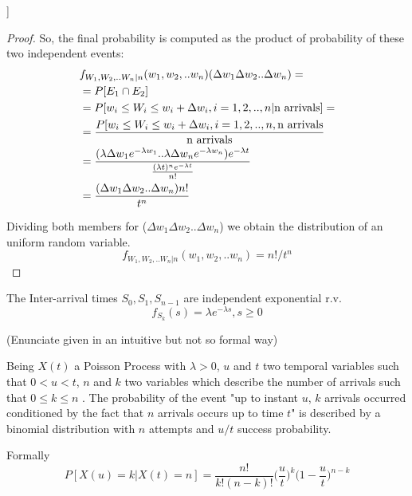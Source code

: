 \begin{theorem}[5.7, Joint probability of [$W_{1}$,..$W_{n}$]]
\begin{proof}
		So, the final probability is computed as the product of probability of these two independent events:
		\begin{equation}
			\begin{split}
				& f_{W_1,W_2,..W_n|n} (w_1,w_2,..w_n)( \Delta w_1\Delta w_2..\Delta w_n) = \\
				& =P[E_1 \cap E_2 ]\\
				& =P[w_i\leq W_i \leq w_i+\Delta w_i, i=1,2,..,n| \textnormal{n arrivals}]=\\
				& =\frac{P[w_i\leq W_i \leq w_i+\Delta w_i, i=1,2,..,n,\textnormal{n arrivals}}{\textnormal{n arrivals}}\\
				& =\frac{(\lambda \Delta w_1 e^{-\lambda w_1}..\lambda \Delta w_n e^{-\lambda w_n})e^{-\lambda t}}{\frac{(\lambda t)^{n}e^{-\lambda t}} {n!}}\\
				& =\frac{ (\Delta w_1 \Delta w_2.. \Delta w_n) n!}{t^n}
			\end{split}
		\end{equation}

		Dividing both members for ($\Delta w_1 \Delta w_2 .. \Delta w_n$) we obtain the distribution of an uniform random variable.
		\begin{equation}
			f_{W_1,W_2,..W_n|n} (w_1,w_2,..w_n) =n!/t^n
		\end{equation}
	\end{proof}
\end{theorem}

\begin{theorem}
	The Inter-arrival times $S_0,S_1, S_{n-1}$ are independent exponential r.v.
	\begin{equation}
		f_{S_k}(s)=\lambda e^{-\lambda s}, s \ge 0
	\end{equation}
\end{theorem}

\begin{theorem}
	(Enunciate given in an intuitive but not so formal way)

	Being $X(t)$ a Poisson Process with $\lambda>0$, $u$ and $t$ two temporal variables such that $0<u<t$, $n$ and $k$ two variables which describe the number of arrivals such that $0\leq k\leq n$ . The probability of the event "up to instant $u$, $k$ arrivals occurred conditioned by the fact that $n$ arrivals occurs up to time $t$" is described by a binomial distribution with $n$ attempts and $u/t$ success probability.

	Formally
	\begin{equation}
		P[X(u)=k|X(t)=n]= \frac{n!}{k!(n-k)!}\bigg(\frac{u}{t}\bigg)^k\bigg(1-\frac{u}{t}\bigg)^{n-k}
	\end{equation}
\end{theorem}

